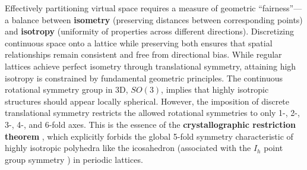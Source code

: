 \documentclass[10pt]{article}
\begin{document}
Effectively partitioning virtual space requires a measure of geometric ``fairness''—a balance between \textbf{isometry} (preserving distances between corresponding points) and \textbf{isotropy} (uniformity of properties across different directions). Discretizing continuous space onto a lattice while preserving both ensures that spatial relationships remain consistent and free from directional bias. While regular lattices achieve perfect isometry through translational symmetry, attaining high isotropy is constrained by fundamental geometric principles. The continuous rotational symmetry group in 3D, $SO(3)$, implies that highly isotropic structures should appear locally spherical. However, the imposition of discrete translational symmetry restricts the allowed rotational symmetries to only 1-, 2-, 3-, 4-, and 6-fold axes. This is the essence of the \textbf{crystallographic restriction theorem} \cite{AshcroftMermin1976}, which explicitly forbids the global 5-fold symmetry characteristic of highly isotropic polyhedra like the icosahedron (associated with the $I_h$ point group symmetry \cite{Coxeter1973}) in periodic lattices.
\end{document}
